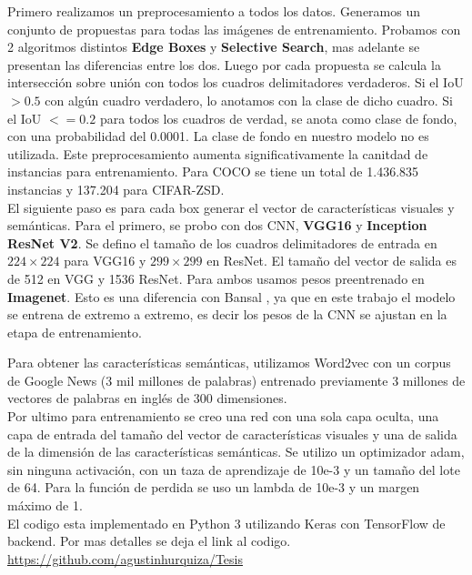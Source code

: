 Primero realizamos un preprocesamiento a todos los datos. Generamos un conjunto de propuestas para todas las imágenes de entrenamiento. Probamos con 2 algoritmos distintos \textbf{Edge Boxes} y \textbf{Selective Search}, mas adelante se presentan las diferencias entre los dos. Luego por cada propuesta se calcula la intersección sobre unión con todos los cuadros delimitadores verdaderos. Si el IoU $> 0.5$ con algún cuadro verdadero, lo anotamos con la clase de dicho cuadro. Si el IoU $<= 0.2$ para todos los cuadros de verdad, se anota como clase de fondo, con una probabilidad del 0.0001. La clase de fondo en nuestro modelo no es utilizada. Este preprocesamiento aumenta significativamente la canitdad de instancias para entrenamiento. Para COCO se tiene un total de 1.436.835 instancias y 137.204 para CIFAR-ZSD. \\

El siguiente paso es para cada box generar el vector de características visuales y semánticas. Para el primero, se probo con dos CNN, \textbf{VGG16} y \textbf{Inception ResNet V2}. Se defino el tamaño de los cuadros delimitadores de entrada en $224 \times 224$ para VGG16 y $299 \times 299$ en ResNet. El tamaño del vector de salida es de 512 en VGG y 1536 ResNet. Para ambos usamos pesos preentrenado en \textbf{Imagenet}. Esto es una diferencia con Bansal \cite{bansal2018zero}, ya que en este trabajo el modelo se entrena de extremo a extremo, es decir los pesos de la CNN se ajustan en la etapa de entrenamiento.

Para obtener las características semánticas, utilizamos Word2vec con un corpus de Google News (3 mil millones de palabras) entrenado previamente 3 millones de vectores de palabras en inglés de 300 dimensiones.\\

Por ultimo para entrenamiento se creo una red con una sola capa oculta, una capa de entrada del tamaño del vector de características visuales y una de salida de la dimensión de las características semánticas. Se utilizo un optimizador adam, sin ninguna activación, con un taza de aprendizaje de 10e-3 y un tamaño del lote de 64. Para la función de perdida se uso un lambda de 10e-3 y un margen máximo de 1.\\

El codigo esta implementado en Python 3 utilizando Keras con TensorFlow de backend. Por mas detalles se deja el link al codigo.\\\url{https://github.com/agustinhurquiza/Tesis}


